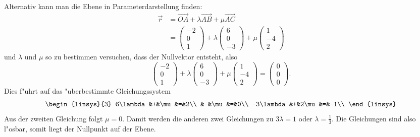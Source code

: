 \begin{loesung}
Alternativ kann man die Ebene in Parameterdarstellung finden:
\begin{align*}
\vec r&=\overrightarrow{OA}+\lambda \overrightarrow{AB}+\mu\overrightarrow{AC}\\
&=
\begin{pmatrix}
-2\\0\\1
\end{pmatrix}
+
\lambda
\begin{pmatrix}
6\\0\\-3
\end{pmatrix}
+
\mu
\begin{pmatrix}
1\\-4\\2
\end{pmatrix}
\end{align*}
und $\lambda$ und $\mu$ so zu bestimmen versuchen, dass
der Nullvektor entsteht, also
\[
\begin{pmatrix}
-2\\0\\1
\end{pmatrix}
+
\lambda
\begin{pmatrix}
6\\0\\-3
\end{pmatrix}
+
\mu
\begin{pmatrix}
1\\-4\\2
\end{pmatrix}
=
\begin{pmatrix}
0\\0\\0
\end{pmatrix}.
\]
Dies f"uhrt auf das "uberbestimmte Gleichungssystem
\[
\begin{linsys}{3}
6\lambda&+&\mu&=&2\\
&-&\mu&=&0\\
-3\lambda&+&2\mu&=&-1\\
\end{linsys}
\]
Aus der zweiten Gleichung folgt $\mu=0$. Damit werden die anderen
zwei Gleichungen zu $3\lambda=1$ oder $\lambda=\frac13$. Die Gleichungen
sind also l"osbar, somit liegt der Nullpunkt auf der Ebene.


\end{loesung}
